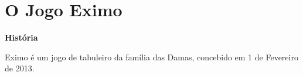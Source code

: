 \documentclass[a4paper]{article}
\begin{document}
\newpage

\section{O Jogo Eximo}

\large{\textbf{História}}
\begin{small}

Eximo é um jogo de tabuleiro da família das Damas, concebido em 1 de Fevereiro de 2013.\newline
\end{small}
\end{document}

